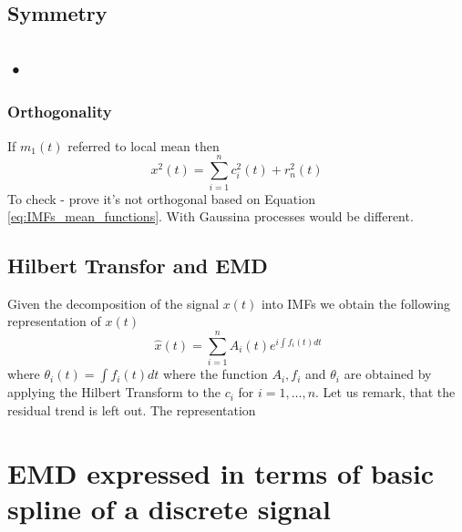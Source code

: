 \documentclass[article,moreauthors,pdftex,10pt,a4paper]{ssrn}
\begin{document}
\subsection{Symmetry}

\subsection{•}

\subsubsection{Orthogonality}

If $m_1(t)$ referred to local mean then
$$
x^2(t) =  \sum_{i = 1}^n c_i^2(t) + r_n^2(t)
$$
To check - prove it's not orthogonal based on Equation \eqref{eq:IMFs_mean_functions}. With Gaussina processes would be different.

\subsection{Hilbert Transfor and EMD}
Given the decomposition of the signal $x(t)$ into IMFs we obtain the following representation of $x(t)$
\begin{equation}\
\hat{x}(t) =  \sum_{i = 1}^n A_i(t)  e^{i  \int f_i(t) dt}
\end{equation}
where $\theta_i(t) =  \int f_i(t) dt$ where the function $A_i, f_i$ and $\theta_i$ are obtained by applying the Hilbert Transform to the $c_i$ for $i = 1,\ldots,n$. Let us remark, that the residual trend is left out.  The representation 


\section{EMD expressed in terms of basic spline of a discrete signal}
\end{document}
